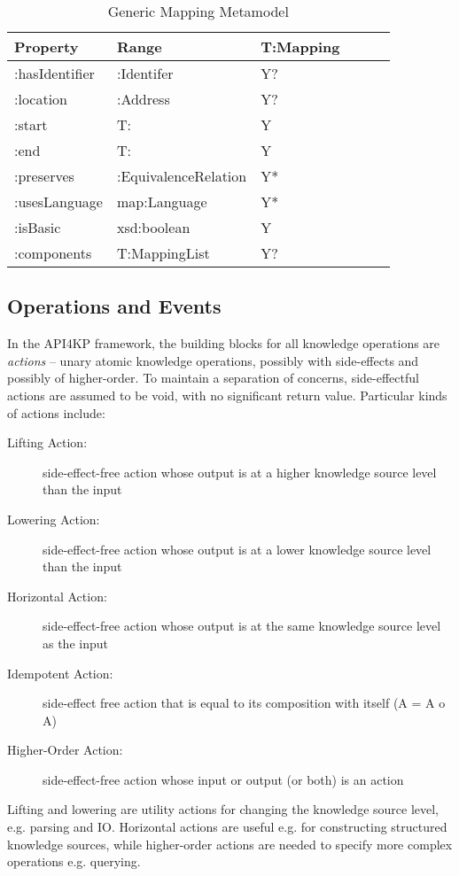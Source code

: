 \documentclass[runningheads]{llncs}
\begin{document}
\begin{table}[h]
\centering
\begin{tabular}{|l|l|l|l|l|l|}
 \hline
\textbf{Property} & \textbf{Range} & \textbf{T:Mapping}   \\ \hline
:hasIdentifier    & :Identifer     &  Y?                       \\ \hline
:location         & :Address       &  Y?                       \\ \hline
:start          & T:               &  Y                       \\ \hline
:end            & T:               &  Y                       \\ \hline
:preserves        & :EquivalenceRelation    &  Y*              \\ \hline
:usesLanguage     & map:Language    &  Y*              \\ \hline
:isBasic         & xsd:boolean     &  Y              \\ \hline
:components      & T:MappingList     &  Y?              \\ \hline
\end{tabular}
\caption{Generic Mapping Metamodel}
\label{krmaponto}
\end{table}


\subsection{Operations and Events}
\label{sec:op}

In the API4KP framework, the building blocks for all knowledge operations are \emph{actions} -- unary atomic knowledge operations, possibly with side-effects and possibly of higher-order. To maintain a separation of concerns, side-effectful actions are assumed to be void, with no significant return value. Particular kinds of actions include:

\begin{description}
      \item[Lifting Action:] side-effect-free action whose output is at a higher knowledge source level than the input
      \item[Lowering Action:]  side-effect-free action whose output is at a lower knowledge source level than the input
      \item[Horizontal Action:] side-effect-free action whose output is at the same knowledge source level as the input
      \item[Idempotent Action:] side-effect free action that is equal to its composition with itself (A = A o A)
      \item[Higher-Order Action:] side-effect-free action whose input or output (or both) is an action
\end{description}
Lifting and lowering are utility actions for changing the knowledge source level, e.g. parsing and IO. 
Horizontal actions are useful e.g. for constructing structured knowledge sources, while higher-order actions are needed to specify more complex operations e.g. querying.
\end{document}
